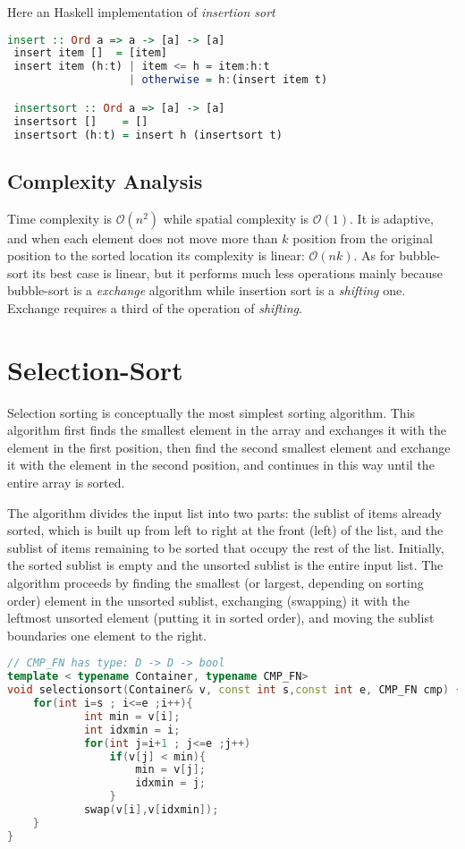 Here an Haskell implementation of \textit{insertion sort}
\begin{lstlisting}[language=Haskell,caption="Haskell Insertion sort "]
 insert :: Ord a => a -> [a] -> [a]
 insert item []  = [item]
 insert item (h:t) | item <= h = item:h:t
                   | otherwise = h:(insert item t)

 insertsort :: Ord a => [a] -> [a]
 insertsort []    = []   
 insertsort (h:t) = insert h (insertsort t)
\end{lstlisting}

\subsection{Complexity Analysis}
Time complexity is  $\mathcal{O}(n^2)$ while spatial complexity is  $\mathcal{O}(1)$. It is adaptive, and when each element does not move more than $k$ position from the original position to the sorted location its complexity is linear:  $\mathcal{O}(nk)$.   As for bubble-sort its best case is linear, but it performs much less operations mainly because bubble-sort is a \textit{exchange} algorithm while insertion sort is a \textit{shifting} one. Exchange requires a third of the operation of \textit{shifting}.

\section{Selection-Sort}
Selection sorting is conceptually the most simplest sorting algorithm. This algorithm first finds the smallest element in the array and exchanges it with the element in the first position, then find the second smallest element and exchange it with the element in the second position, and continues in this way until the entire array is sorted. 

The algorithm divides the input list into two parts: the sublist of items already sorted, which is built up from left to right at the front (left) of the list, and the sublist of items remaining to be sorted that occupy the rest of the list. Initially, the sorted sublist is empty and the unsorted sublist is the entire input list. The algorithm proceeds by finding the smallest (or largest, depending on sorting order) element in the unsorted sublist, exchanging (swapping) it with the leftmost unsorted element (putting it in sorted order), and moving the sublist boundaries one element to the right.

\begin{lstlisting}[language=c++, caption="Selection Sort implementation in C++14"]
// CMP_FN has type: D -> D -> bool
template < typename Container, typename CMP_FN>
void selectionsort(Container& v, const int s,const int e, CMP_FN cmp) {
    for(int i=s ; i<=e ;i++){
            int min = v[i];
            int idxmin = i;
            for(int j=i+1 ; j<=e ;j++)
                if(v[j] < min){
                    min = v[j];
                    idxmin = j;
                }
            swap(v[i],v[idxmin]);
    }
}
\end{lstlisting}



